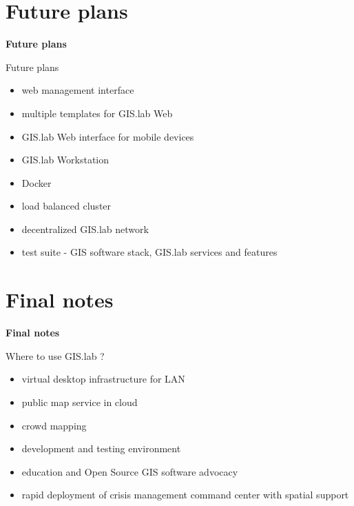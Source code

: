 \documentclass[12pt]{beamer}
\begin{document}
\section{Future plans}
\begin{frame}
	\begin{center}
		\LARGE\textbf{Future plans}
	\end{center}
\end{frame}


\begin{frame}{Future plans}
	\begin{itemize}
		\item web management interface
		\item multiple templates for GIS.lab Web
		\item GIS.lab Web interface for mobile devices
		\item GIS.lab Workstation
		\item Docker
		\item load balanced cluster
		\item decentralized GIS.lab network
		\item test suite - GIS software stack, GIS.lab services and features
	\end{itemize}
\end{frame}


\section{Final notes}
\begin{frame}
	\begin{center}
		\LARGE\textbf{Final notes}
	\end{center}
\end{frame}


\begin{frame}{Where to use GIS.lab ?}
	\begin{itemize}
		\item virtual desktop infrastructure for LAN
		\item public map service in cloud
		\item crowd mapping
		\item development and testing environment
		\item education and Open Source GIS software advocacy
		\item rapid deployment of crisis management command center with spatial support
	\end{itemize}
\end{frame}
\end{document}
